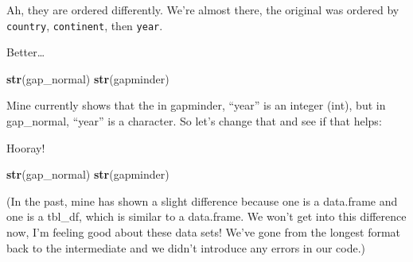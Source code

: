 \documentclass[]{book}
\newenvironment{Shaded}{\begin{snugshade}}{\end{snugshade}}
\newcommand{\KeywordTok}[1]{\textcolor[rgb]{0.13,0.29,0.53}{\textbf{{#1}}}}
\newcommand{\DataTypeTok}[1]{\textcolor[rgb]{0.13,0.29,0.53}{{#1}}}
\newcommand{\StringTok}[1]{\textcolor[rgb]{0.31,0.60,0.02}{{#1}}}
\newcommand{\NormalTok}[1]{{#1}}
\theoremstyle{definition}
\theoremstyle{definition}
\theoremstyle{definition}
\theoremstyle{remark}
\begin{document}
Ah, they are ordered differently. We're almost there, the original was
ordered by \texttt{country}, \texttt{continent}, then \texttt{year}.

\begin{Shaded}
\end{Shaded}

Better\ldots{}

\begin{Shaded}
\begin{Highlighting}[]
\KeywordTok{str}\NormalTok{(gap_normal)}
\KeywordTok{str}\NormalTok{(gapminder)}
\end{Highlighting}
\end{Shaded}

Mine currently shows that the in gapminder, ``year'' is an integer
(int), but in gap\_normal, ``year'' is a character. So let's change that
and see if that helps:

\begin{Shaded}
\end{Shaded}

Hooray!

\begin{Shaded}
\begin{Highlighting}[]
\KeywordTok{str}\NormalTok{(gap_normal)}
\KeywordTok{str}\NormalTok{(gapminder)}
\end{Highlighting}
\end{Shaded}

(In the past, mine has shown a slight difference because one is a
data.frame and one is a tbl\_df, which is similar to a data.frame. We
won't get into this difference now, I'm feeling good about these data
sets! We've gone from the longest format back to the intermediate and we
didn't introduce any errors in our code.)
\end{document}
